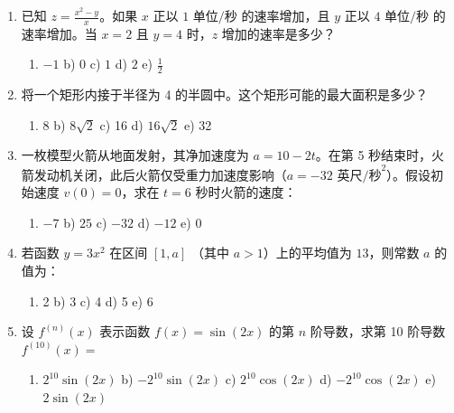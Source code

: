 \documentclass[12pt,a4paper]{article}
\begin{document}
\begin{enumerate}[label=\arabic*), itemsep=15pt, start=16]
    \item 已知 $z = \frac{x^2 - y}{x}$。如果 $x$ 正以 $1 \text{ 单位/秒}$ 的速率增加，且 $y$ 正以 $4 \text{ 单位/秒}$ 的速率增加。当 $x = 2$ 且 $y = 4$ 时，$z$ 增加的速率是多少？
    \begin{enumerate}[label=\alph*), itemsep=0pt]
        \item $-1$ \quad b) $0$ \quad c) $1$ \quad d) $2$ \quad e) $\frac{1}{2}$
    \end{enumerate}

    \item 将一个矩形内接于半径为 4 的半圆中。这个矩形可能的最大面积是多少？
    \begin{enumerate}[label=\alph*), itemsep=0pt]
        \item 8 \quad b) $8\sqrt{2}$ \quad c) 16 \quad d) $16\sqrt{2}$ \quad e) 32
    \end{enumerate}

    \item 一枚模型火箭从地面发射，其净加速度为 $a = 10 - 2t$。在第 5 秒结束时，火箭发动机关闭，此后火箭仅受重力加速度影响（$a = -32 \text{ 英尺/秒}^2$）。假设初始速度 $v(0)=0$，求在 $t=6$ 秒时火箭的速度：
    \begin{enumerate}[label=\alph*), itemsep=0pt]
        \item $-7$ \quad b) $25$ \quad c) $-32$ \quad d) $-12$ \quad e) $0$
    \end{enumerate}

    \item 若函数 $y = 3x^2$ 在区间 $[1, a]$ （其中 $a > 1$）上的平均值为 $13$，则常数 $a$ 的值为：
    \begin{enumerate}[label=\alph*), itemsep=0pt]
        \item 2 \quad b) 3 \quad c) 4 \quad d) 5 \quad e) 6
    \end{enumerate}

    \item 设 $f^{(n)}(x)$ 表示函数 $f(x) = \sin(2x)$ 的第 $n$ 阶导数，求第 10 阶导数 $f^{(10)}(x) =$
    \begin{enumerate}[label=\alph*), itemsep=0pt]
        \item $2^{10} \sin(2x)$ \quad b) $-2^{10} \sin(2x)$ \quad c) $2^{10} \cos(2x)$ \quad d) $-2^{10} \cos(2x)$ \quad e) $2 \sin(2x)$
    \end{enumerate}


\end{enumerate}
\end{document}
